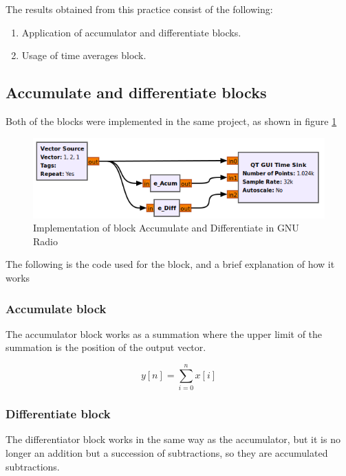 \documentclass{journal}[IEEEtran, twocolumn]             %
\begin{document}
\begin{multicols}{2}
The results obtained from this practice consist of the following:

\begin{enumerate}
    \item  Application of accumulator and differentiate blocks.
    \item  Usage of time averages block.
\end{enumerate}

\subsection{Accumulate and differentiate blocks}
Both of the blocks were implemented in the same project, as shown in figure \ref{fig:fig_2}

\begin{figure}[H]
        \centering
        \begin{adjustbox}{frame=1pt 1pt,center=1pt}
            \includegraphics[width=0.8\columnwidth]{figs/blocks.png}
        \end{adjustbox}
        \caption{\centering Implementation of block Accumulate and Differentiate in GNU Radio}
        \label{fig:fig_2}
\end{figure}

The following is the code used for the block, and a brief explanation of how it works

\subsubsection{Accumulate block}
The accumulator block works as a summation where the upper limit of the summation is the position of the output vector.

\begin{equation*}
    y[n] = \sum_{i=0}^{n} x[i]
\end{equation*}

\subsubsection{Differentiate block}
The differentiator block works in the same way as the accumulator, but it is no longer an addition but a succession of subtractions, so they are accumulated subtractions.


\end{multicols}
\end{document}
